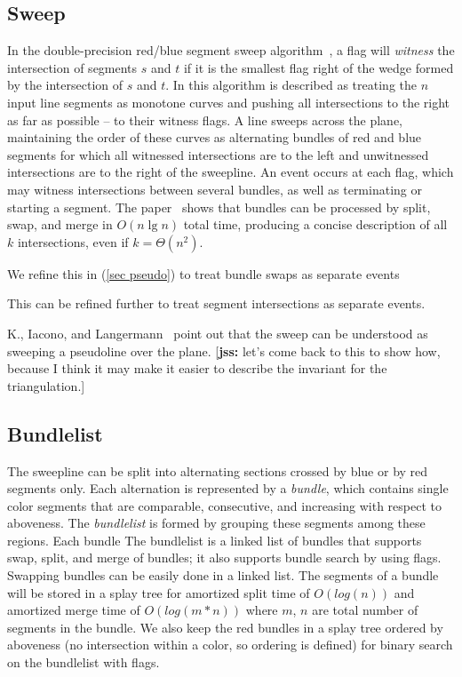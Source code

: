\documentclass[11pt]{article}
\def\jss#1{{\footnotesize [{\bf jss:} #1]}}
\begin{document}
\subsection{Sweep}\label{sec sweep}
In the double-precision red/blue segment sweep algorithm~\cite{MS}, a flag will \textit{witness} the intersection of segments $s$ and $t$ if it is the smallest flag right of the wedge formed by the intersection of $s$ and $t$.
In \cite{MS} this algorithm is described as 
treating the $n$ input line segments as monotone curves and pushing all intersections to the right as far as possible -- to their witness flags. 
A line sweeps across the plane, maintaining the order of these curves as alternating bundles of red and blue segments for which all witnessed intersections are to the left and unwitnessed intersections are to the right of the sweepline. 
An event occurs at each flag, which may witness intersections between several bundles, as well as terminating or starting a segment.  
The paper~\cite{MS} shows that bundles can be processed by split, swap, and merge in $O(n\lg n)$ total time, producing a concise description of all $k$ intersections, even if $k=\Theta(n^2)$.

We refine this in (\ref{sec pseudo}) to treat bundle swaps as separate events

This can be refined further to treat segment intersections as separate events. 

K., Iacono, and Langermann~\cite{}  point out that the sweep can be understood as sweeping a pseudoline over the plane.  \jss{let's come back to this to show how, because I think it may make it easier to describe the invariant for the triangulation.}

\subsection{Bundlelist}
The sweepline can be split into alternating sections crossed by blue or by red segments only.
Each alternation is represented by a \textit{bundle}, which contains single color segments that are comparable, consecutive, and increasing with respect to aboveness.
The \textit{bundlelist}
 is formed by grouping these segments among these regions.
Each bundle 
The bundlelist is  a linked list of bundles that supports swap, split, and merge of bundles; it also supports bundle search by using flags.
Swapping bundles can be easily done in a linked list.
The segments of a bundle will be stored in a splay tree for amortized split time of $O(log(n))$ and amortized merge time of $O(log(m*n))$ where $m$, $n$ are total number of segments in the bundle.
We also keep the red bundles in a splay tree ordered by aboveness (no intersection within a color, so ordering is defined) for binary search on the bundlelist with flags.
\end{document}
